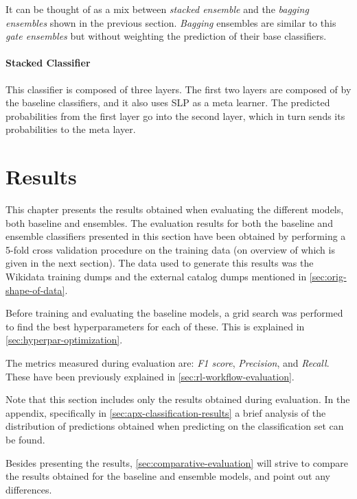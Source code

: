 \documentclass[epsfig,a4paper,11pt,titlepage,twoside,openany]{book}
\begin{document}
It can be thought of as a mix between \textit{stacked ensemble} and the \textit{bagging ensembles} shown in the previous section. \textit{Bagging} ensembles are similar to this \textit{gate ensembles} but without weighting the prediction of their base classifiers. 


\subsubsection{Stacked Classifier}
\label{sec:stack-classifier}

This classifier is composed of three layers. The first two layers are composed of by the baseline classifiers, and it also uses SLP as a meta learner. The predicted probabilities from the first layer go into the second layer, which in turn sends its probabilities to the meta layer. 





\chapter{Results}
\label{chap:results}

This chapter presents the results obtained when evaluating the different models, both baseline and ensembles. The evaluation results for both the baseline and ensemble classifiers presented in this section have been obtained by performing a 5-fold cross validation procedure on the training data (on overview of which is given in the next section). The data used to generate this results was the Wikidata training dumps and the external catalog dumps mentioned in \autoref{sec:orig-shape-of-data}.

Before training and evaluating the baseline models, a grid search was performed to find the best hyperparameters for each of these. This is explained in \autoref{sec:hyperpar-optimization}.

The metrics measured during evaluation are: \textit{F1 score}, \textit{Precision}, and \textit{Recall}. These have been previously explained in \autoref{sec:rl-workflow-evaluation}. 

Note that this section includes only the results obtained during evaluation. In the appendix, specifically in \autoref{sec:apx-classification-results} a brief analysis of the distribution of predictions obtained when predicting on the classification set can be found.

Besides presenting the results, \autoref{sec:comparative-evaluation} will strive to compare the results obtained for the baseline and ensemble models, and point out any differences.
\end{document}
